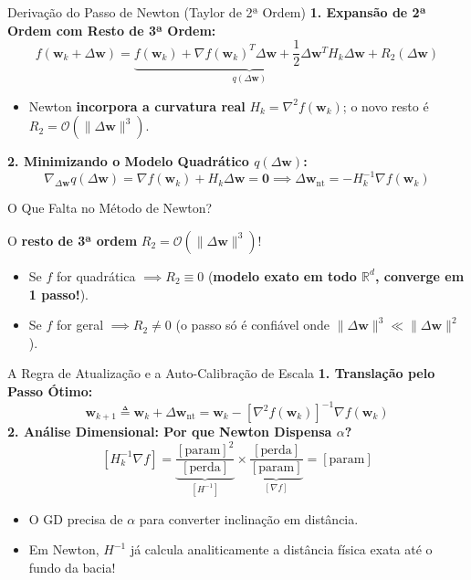 \documentclass[aspectratio=169, 10pt]{beamer}
\newenvironment{calloutnote}[1][Nota]{%
  \begin{block}{#1}%
}{%
  \end{block}%
}
\begin{document}
\begin{frame}{Derivação do Passo de Newton (Taylor de 2ª Ordem)}
  \textbf{1. Expansão de 2ª Ordem com Resto de 3ª Ordem:}
  \[f(\mathbf{w}_k + \Delta\mathbf{w}) = \underbrace{f(\mathbf{w}_k) + \nabla f(\mathbf{w}_k)^T \Delta\mathbf{w} + \frac{1}{2} \Delta\mathbf{w}^T H_k \Delta\mathbf{w}}_{q(\Delta\mathbf{w})} + R_2(\Delta\mathbf{w})\]
  \begin{itemize}
    \item Newton \textbf{incorpora a curvatura real} $H_k = \nabla^2 f(\mathbf{w}_k)$; o novo resto é $R_2 = \mathcal{O}(\|\Delta\mathbf{w}\|^3)$.
  \end{itemize}
  \vspace{0.2cm}
  \textbf{2. Minimizando o Modelo Quadrático $q(\Delta\mathbf{w})$:}
  \[\nabla_{\Delta\mathbf{w}} q(\Delta\mathbf{w}) = \nabla f(\mathbf{w}_k) + H_k \Delta\mathbf{w} = \mathbf{0} \implies \Delta\mathbf{w}_{\text{nt}} = -H_k^{-1} \nabla f(\mathbf{w}_k)\]
  \vspace{0.3cm}
  \begin{calloutnote}[O Que Falta no Método de Newton?]
    O \textbf{resto de 3ª ordem} $R_2 = \mathcal{O}(\|\Delta\mathbf{w}\|^3)$!
    \begin{itemize}
      \item Se $f$ for quadrática $\implies R_2 \equiv 0$ (\textbf{modelo exato em todo $\mathbb{R}^d$, converge em 1 passo!}).
      \item Se $f$ for geral $\implies R_2 \neq 0$ (o passo só é confiável onde $\|\Delta\mathbf{w}\|^3 \ll \|\Delta\mathbf{w}\|^2$).
    \end{itemize}
  \end{calloutnote}
\end{frame}

\begin{frame}{A Regra de Atualização e a Auto-Calibração de Escala}
  \textbf{1. Translação pelo Passo Ótimo:}
  \[\mathbf{w}_{k+1} \triangleq \mathbf{w}_k + \Delta\mathbf{w}_{\text{nt}} = \mathbf{w}_k - [\nabla^2 f(\mathbf{w}_k)]^{-1} \nabla f(\mathbf{w}_k)\]
  \vspace{0.3cm}
  \textbf{2. Análise Dimensional: Por que Newton Dispensa $\alpha$?}
  \[[H_k^{-1} \nabla f] = \underbrace{\frac{[\text{param}]^2}{[\text{perda}]}}_{[H^{-1}]} \times \underbrace{\frac{[\text{perda}]}{[\text{param}]}}_{[\nabla f]} = [\text{param}]\]
  \begin{itemize}
    \item O GD precisa de $\alpha$ para converter inclinação em distância.
    \item Em Newton, $H^{-1}$ já calcula analiticamente a distância física exata até o fundo da bacia!
  \end{itemize}
\end{frame}
\end{document}
